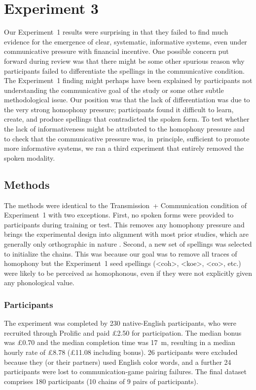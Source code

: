 \documentclass[doc,biblatex]{apa7}
\begin{document}
\clearpage

\section{Experiment 3}

Our Experiment~1 results were surprising in that they failed to find much evidence for the emergence of clear, systematic, informative systems, even under communicative pressure with financial incentive. One possible concern put forward during review was that there might be some other spurious reason why participants failed to differentiate the spellings in the communicative condition. The Experiment~1 finding might perhaps have been explained by participants not understanding the communicative goal of the study or some other subtle methodological issue. Our position was that the lack of differentiation was due to the very strong homophony pressure; participants found it difficult to learn, create, and produce spellings that contradicted the spoken form. To test whether the lack of informativeness might be attributed to the homophony pressure and to check that the communicative pressure was, in~principle, sufficient to promote more informative systems, we ran a third experiment that entirely removed the spoken modality.

\subsection{Methods}

The methods were identical to the Transmission~+ Communication condition of Experiment~1 with two exceptions. First, no spoken forms were provided to participants during training or test. This removes any homophony pressure and brings the experimental design into alignment with most prior studies, which are generally only orthographic in nature \parencite[e.g.,][]{Kirby:2008, Kirby:2015, Beckner:2017}. Second, a new set of spellings was selected to initialize the chains. This was because our goal was to remove all traces of homophony but the Experiment~1 seed spellings (<coh>, <koe>, <co>, etc.) were likely to be perceived as homophonous, even if they were not explicitly given any phonological value.

\subsubsection{Participants}

The experiment was completed by 230 native-English participants, who were recruited through Prolific and paid £2.50 for participation. The median bonus was £0.70 and the median completion time was 17~m, resulting in a median hourly rate of £8.78 (£11.08 including bonus). 26 participants were excluded because they (or their partners) used English color words, and a further 24 participants were lost to communication-game pairing failures. The final dataset comprises 180 participants (10 chains of 9 pairs of participants).
\end{document}
